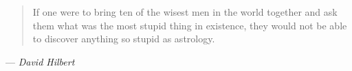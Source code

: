 %
\cleardoublepage
\thispagestyle{empty}



\begin{quote}
    If one were to bring ten of the wisest men in the world together and ask them what was the most stupid thing in existence, they would not be able to discover anything so stupid as astrology.
\end{quote}
--- \emph{David Hilbert}

\clearemptydoublepage
